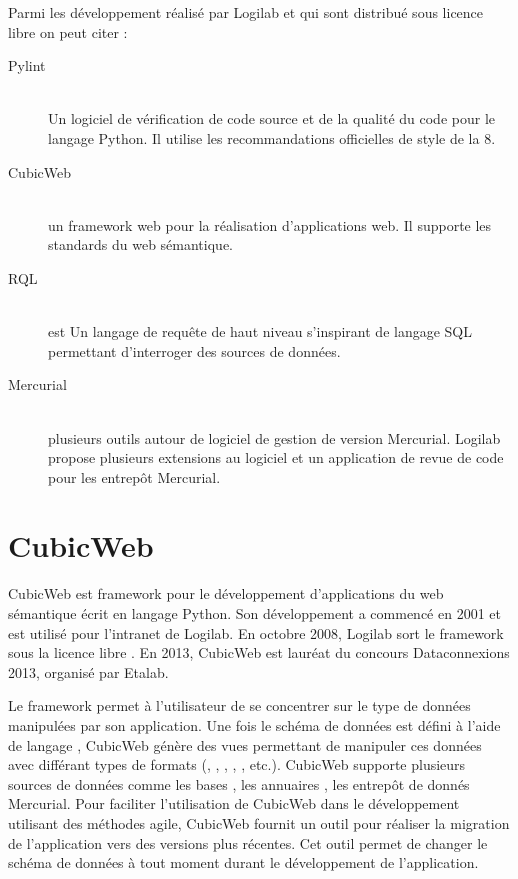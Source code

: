 Parmi les développement réalisé par Logilab et qui sont distribué sous licence libre on peut citer :
\begin{description}
\item[Pylint]\hfill\\ Un logiciel de vérification de code source et de la qualité du code pour le langage Python. Il utilise les recommandations officielles de style de la  8.
\item[CubicWeb]\hfill\\ un framework web pour la réalisation d’applications web. Il supporte les standards du web sémantique.
\item[RQL]\hfill\\  est Un langage de requête de haut niveau s’inspirant de langage SQL permettant d'interroger des sources de données.
\item[Mercurial] \hfill\\ plusieurs outils autour de logiciel de gestion de version Mercurial. Logilab propose plusieurs extensions au logiciel et un application de revue de code pour les entrepôt Mercurial. 
\end{description}



\section{CubicWeb}
CubicWeb est framework pour le développement d'applications du web sémantique écrit en langage Python. Son développement a commencé en 2001 et est utilisé pour l'intranet de Logilab. En octobre 2008, Logilab sort le framework sous la licence libre . En 2013, CubicWeb est lauréat du concours Dataconnexions 2013, organisé par Etalab\cite{etalab}.

Le framework permet à l'utilisateur de se concentrer sur le type de données manipulées par son application. Une fois le schéma de données est défini à l'aide de langage , CubicWeb génère des vues permettant de manipuler ces données avec différant types de formats (, , , , , etc.). CubicWeb supporte plusieurs sources de données comme les bases , les annuaires , les entrepôt de donnés Mercurial. Pour faciliter l'utilisation de CubicWeb dans le développement utilisant des méthodes agile, CubicWeb fournit un outil pour réaliser la migration de l'application vers des versions plus récentes. Cet outil permet de changer le schéma de données à tout moment durant le développement de l'application.


